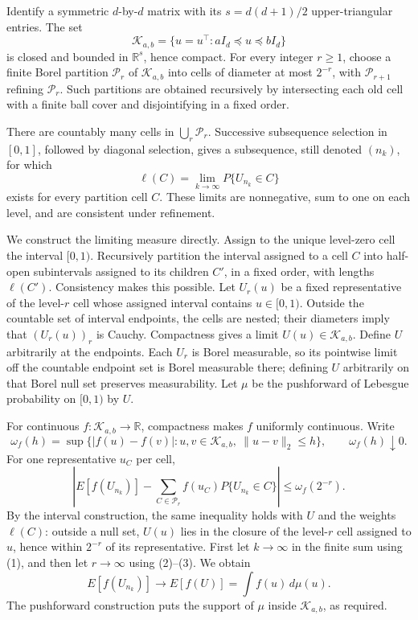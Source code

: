 Identify a symmetric \(d\)-by-\(d\) matrix with its
\(s=d(d+1)/2\) upper-triangular entries.  The set
\[
 \mathcal K_{a,b}=\{u=u^\top:aI_d\preceq u\preceq bI_d\}
\]
is closed and bounded in \(\mathbb R^s\), hence compact.  For every integer
\(r\ge1\), choose a finite Borel partition \(\mathcal P_r\) of
\(\mathcal K_{a,b}\) into cells of diameter at most \(2^{-r}\), with
\(\mathcal P_{r+1}\) refining \(\mathcal P_r\).  Such partitions are
obtained recursively by intersecting each old cell with a finite ball cover
and disjointifying in a fixed order.

There are countably many cells in \(\bigcup_r\mathcal P_r\).  Successive
subsequence selection in \([0,1]\), followed by diagonal selection, gives a
subsequence, still denoted \((n_k)\), for which
\[
 \ell(C)=\lim_{k\to\infty}P\{U_{n_k}\in C\}
\tag{1}
\]
exists for every partition cell \(C\).  These limits are nonnegative, sum
to one on each level, and are consistent under refinement.

We construct the limiting measure directly.  Assign to the unique
level-zero cell the interval \([0,1)\).  Recursively partition the interval
assigned to a cell \(C\) into half-open subintervals assigned to its children
\(C'\), in a fixed order, with lengths \(\ell(C')\).  Consistency makes this
possible.  Let \(U_r(u)\) be a fixed representative of the level-\(r\) cell
whose assigned interval contains \(u\in[0,1)\).  Outside the countable set
of interval endpoints, the cells are nested; their diameters imply that
\((U_r(u))_r\) is Cauchy.  Compactness gives a limit
\(U(u)\in\mathcal K_{a,b}\).  Define \(U\) arbitrarily at the endpoints.
Each \(U_r\) is Borel measurable, so its pointwise limit off the countable
endpoint set is Borel measurable there; defining \(U\) arbitrarily on that
Borel null set preserves measurability.  Let \(\mu\)
be the pushforward of Lebesgue probability on \([0,1)\) by \(U\).

For continuous \(f:\mathcal K_{a,b}\to\mathbb R\), compactness makes
\(f\) uniformly continuous.  Write
\[
 \omega_f(h)=\sup\{|f(u)-f(v)|:u,v\in\mathcal K_{a,b},\
 \|u-v\|_2\le h\},
 \qquad \omega_f(h)\downarrow0.
\tag{2}
\]
For one representative \(u_C\) per cell,
\[
 \left|E[f(U_{n_k})]-\sum_{C\in\mathcal P_r}
 f(u_C)P\{U_{n_k}\in C\}\right|\le\omega_f(2^{-r}).
\tag{3}
\]
By the interval construction, the same inequality holds with \(U\) and
the weights \(\ell(C)\): outside a null set, \(U(u)\) lies in the closure
of the level-\(r\) cell assigned to \(u\), hence within \(2^{-r}\) of its
representative.  First let \(k\to\infty\) in the finite sum using (1), and
then let \(r\to\infty\) using (2)--(3).  We obtain
\[
 E[f(U_{n_k})]\longrightarrow E[f(U)]=\int f(u)\,d\mu(u).
\]
The pushforward construction puts the support of \(\mu\) inside
\(\mathcal K_{a,b}\), as required.